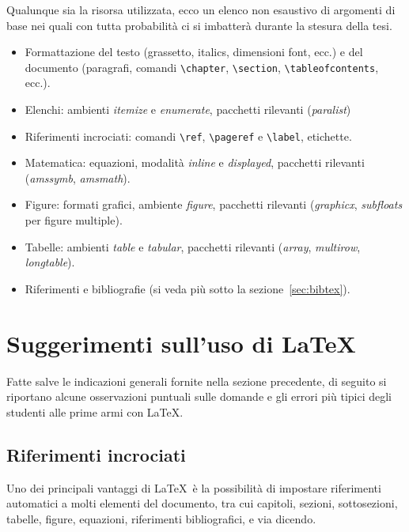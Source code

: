 Qualunque sia la risorsa utilizzata, ecco un elenco non esaustivo di argomenti di base nei quali con tutta probabilit\`a ci si imbatter\`a durante la stesura della tesi.
\begin{itemize}
\item Formattazione del testo (grassetto, italics, dimensioni font, ecc.) e del documento (paragrafi, comandi \verb|\chapter|, \verb|\section|, \verb|\tableofcontents|, ecc.).
\item Elenchi: ambienti {\em itemize} e {\em enumerate}, pacchetti rilevanti ({\em paralist})
\item Riferimenti incrociati: comandi \verb|\ref|, \verb|\pageref| e \verb|\label|, etichette.
\item Matematica: equazioni, modalit\`a {\em inline} e {\em displayed}, pacchetti rilevanti ({\em amssymb}, {\em amsmath}).
\item Figure: formati grafici, ambiente {\em figure}, pacchetti rilevanti ({\em graphicx}, {\em subfloats} per figure multiple).
\item Tabelle: ambienti {\em table} e {\em tabular}, pacchetti rilevanti ({\em array}, {\em multirow}, {\em longtable}).
\item Riferimenti e bibliografie (si veda pi\`u sotto la sezione~\ref{sec:bibtex}).
\end{itemize}

\section{Suggerimenti sull'uso di \LaTeX}
\label{sec:consigli_latex}

Fatte salve le indicazioni generali fornite nella sezione precedente, di seguito si riportano alcune osservazioni puntuali sulle domande e gli errori pi\`u tipici degli studenti alle prime armi con \LaTeX.

\subsection{Riferimenti incrociati}

Uno dei principali vantaggi di \LaTeX\ è la possibilità di impostare riferimenti automatici a molti elementi del documento, tra cui capitoli, sezioni, sottosezioni, tabelle, figure, equazioni, riferimenti bibliografici, e via dicendo.

